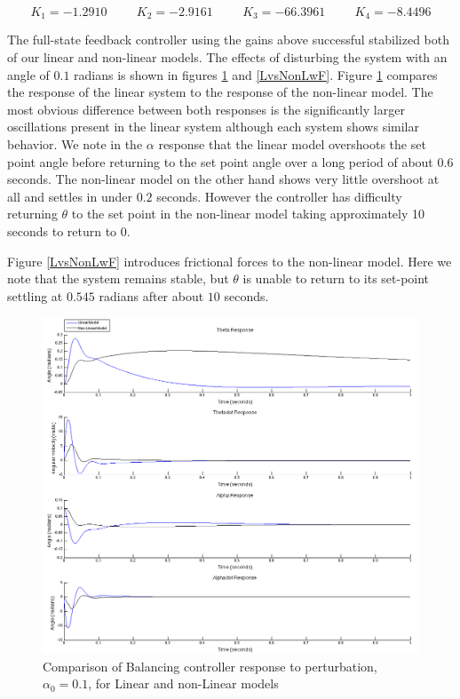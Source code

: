 \documentclass{article}
\theoremstyle{plain}
\theoremstyle{definition}
\theoremstyle{remark}
\begin{document}
$$ K_1 = -1.2910 \hspace{1cm} K_2 = -2.9161 \hspace{1cm} K_3 = -66.3961 \hspace{1cm} K_4 = -8.4496 $$

The full-state feedback controller using the gains above successful stabilized both of our linear and non-linear models.  The effects of disturbing the system with an angle of $0.1$ radians is shown in figures \ref{LvsNonLwoutF} and \ref{LvsNonLwF}.  Figure \ref{LvsNonLwoutF} compares the response of the linear system to the response of the non-linear model.  The most obvious difference between both responses is the significantly larger oscillations present in the linear system although each system shows similar behavior.  We note in the $\alpha$ response that the linear model overshoots the set point angle before returning to the set point angle over a long period of about $0.6$ seconds.  The non-linear model on the other hand shows very little overshoot at all and settles in under $0.2$ seconds.  However the controller has difficulty returning $\theta$ to the set point in the non-linear model taking approximately 10 seconds to return to $0$. 

Figure \ref{LvsNonLwF} introduces frictional forces to the non-linear model.  Here we note that the system remains stable, but $\theta$ is unable to return to its set-point settling at $0.545$ radians after about $10$ seconds.  

\begin{figure}
\begin{center}
\includegraphics[width = 16cm]{nonlinearvslinearwoutF.png}
\end{center}
\caption{Comparison of Balancing controller response to perturbation, $\alpha_0 = 0.1$, for Linear and non-Linear models}
\label{LvsNonLwoutF}
\end{figure}
\end{document}
